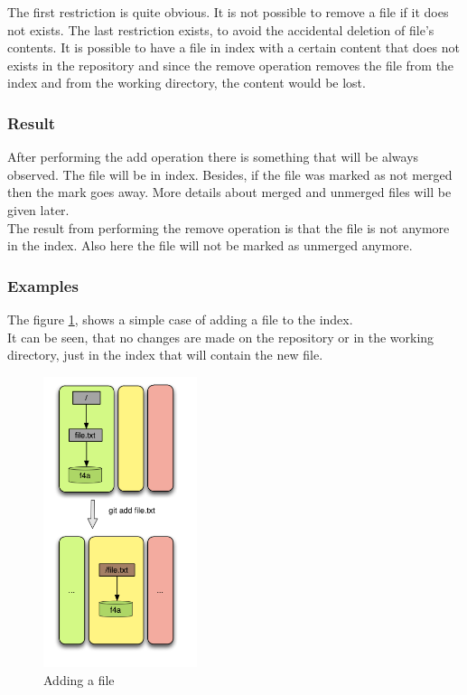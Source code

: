 The first restriction is quite obvious. It is not possible to remove
a file if it does not exists. The last restriction exists, to avoid
the accidental deletion of file's contents. It is possible to have a
file in index with a certain content that does not exists in the
repository and since the remove operation removes the file from the index
and from the working directory, the content would be lost.  

\subsubsection{Result}
After performing the add operation there is something that will be
always observed. The file will be in index. Besides, if the file was
marked as not merged then the mark goes away. More details about
merged and unmerged files will be given later.\\

The result from performing the remove operation is that the file is
not anymore in the index. Also here the file will not be marked as
unmerged anymore.

\subsubsection{Examples}

The figure \ref{fig:add1}, shows a simple case of adding a file to the index. \\
It can be seen, that no changes are made on the repository or in the working
directory, just in the index that will contain the new file.

\begin{figure}[!h]
   \centering
   \includegraphics[width=0.4\textwidth]{images/add1.png}
   \caption{Adding a file}\label{fig:add1}
\end{figure}

